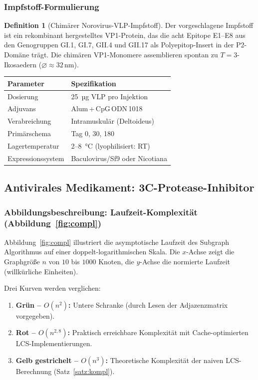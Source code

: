 ﻿\documentclass[a4paper,12pt]{article}
\theoremstyle{plain}
\theoremstyle{definition}
\newtheorem{definition}[satz]{Definition}
\theoremstyle{remark}
\begin{document}
\subsubsection{Impfstoff-Formulierung}

\begin{definition}[Chimärer Norovirus-VLP-Impfstoff]
Der vorgeschlagene Impfstoff ist ein rekombinant hergestelltes VP1-Protein, das die
acht Epitope E1--E8 aus den Genogruppen GI.1, GI.7, GII.4 und GII.17 als
Polyepitop-Insert in der P2-Domäne trägt. Die chimären VP1-Monomere assemblieren
spontan zu $T=3$-Ikosaedern ($\varnothing\approx32\,\text{nm}$).
\end{definition}

\begin{center}
\begin{tabular}{ll}
\toprule
\textbf{Parameter}  & \textbf{Spezifikation} \\
\midrule
Dosierung           & 25\, µg VLP pro Injektion \\
Adjuvans            & Alum\,+\,CpG\,ODN\,1018 \\
Verabreichung       & Intramuskulär (Deltoideus) \\
Primärschema        & Tag 0, 30, 180 \\
Lagertemperatur     & 2--8\, °C (lyophilisiert: RT) \\
Expressionssystem   & Baculovirus/Sf9 oder Nicotiana \\
\bottomrule
\end{tabular}
\end{center}

\subsection{Antivirales Medikament: 3C-Protease-Inhibitor}

\subsubsection{Abbildungsbeschreibung: Laufzeit-Komplexität (Abbildung~\ref{fig:compl})}

Abbildung~\ref{fig:compl} illustriert die asymptotische Laufzeit des Subgraph Algorithmus
auf einer doppelt-logarithmischen Skala. Die $x$-Achse zeigt die Graphgröße $n$ von
$10$ bis $1000$ Knoten, die $y$-Achse die normierte Laufzeit (willkürliche Einheiten).

Drei Kurven werden verglichen:
\begin{enumerate}
  \item \textbf{Grün -- $O(n^2)$:} Untere Schranke (durch Lesen der Adjazenzmatrix vorgegeben).
  \item \textbf{Rot -- $O(n^{2{,}8})$:} Praktisch erreichbare Komplexität mit Cache-optimierten
        LCS-Implementierungen.
  \item \textbf{Gelb gestrichelt -- $O(n^3)$:} Theoretische Komplexität der naiven
        LCS-Berechnung (Satz~\ref{satz:kompl}).
\end{enumerate}
\end{document}
